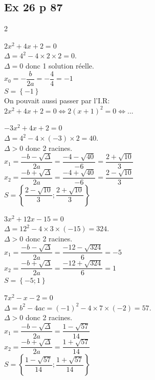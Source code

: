 \documentclass[12pt,a4paper]{book}
\begin{document}
\subsection*{Ex 26 p 87}
\begin{multicols}{2}
\begin{enumMet}
    \item $2x^2+4x+2=0$\\
    $\Delta=4^2-4\times2\times2=0$.\\
    $\Delta=0$ donc 1 solution réelle.\\
    $x_0=-\dfrac{b}{2a}=-\dfrac{4}{4}=-1$\\
    $S=\left\{-1\right\}$\\
    On pouvait aussi passer par l'I.R:\\
    $2x^2+4x+2=0\iff 2(x+1)^2=0\iff ...$
    \item $-3x^2+4x+2=0$\\
    $\Delta=4^2-4\times(-3)\times2=40$.\\
    $\Delta>0$ donc 2 racines.\\
    $x_1=\dfrac{-b-\sqrt{\Delta}}{2a}=\dfrac{-4-\sqrt{40}}{-6}=\dfrac{2+\sqrt{10}}{3}$\\
    $x_2=\dfrac{-b+\sqrt{\Delta}}{2a}=\dfrac{-4+\sqrt{40}}{-6}=\dfrac{2-\sqrt{10}}{3}$\\
    $S=\left\{\dfrac{2-\sqrt{10}}{3};\dfrac{2+\sqrt{10}}{3}\right\}$
    
    \columnbreak
    \item $3x^2+12x-15=0$\\
    $\Delta=12^2-4\times3\times(-15)=324$.\\
    $\Delta>0$ donc 2 racines.\\
    $x_1=\dfrac{-b-\sqrt{\Delta}}{2a}=\dfrac{-12-\sqrt{324}}{6}=-5$\\
    $x_2=\dfrac{-b+\sqrt{\Delta}}{2a}=\dfrac{-12+\sqrt{324}}{6}=1$\\
    $S=\left\{-5;1\right\}$
    \item $7x^2-x-2=0$\\
    $\Delta=b^2-4ac=(-1)^2-4\times7\times(-2)=57$.\\
    $\Delta>0$ donc 2 racines.\\
    $x_1=\dfrac{-b-\sqrt{\Delta}}{2a}=\dfrac{1-\sqrt{57}}{14}$\\
    $x_2=\dfrac{-b+\sqrt{\Delta}}{2a}=\dfrac{1+\sqrt{57}}{14}$\\
    $S=\left\{\dfrac{1-\sqrt{57}}{14};\dfrac{1+\sqrt{57}}{14}\right\}$
\end{enumMet}
\end{multicols}
\end{document}
